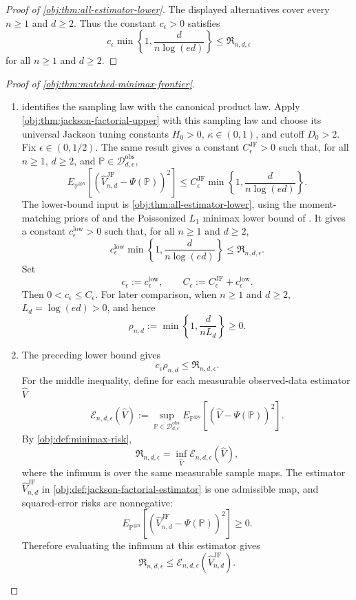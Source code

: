 \documentclass[11pt]{article}
\begin{document}
\begin{proof}[Proof of \cref{obj:thm:all-estimator-lower}]
The displayed alternatives cover every \(n\ge1\) and \(d\ge2\).  Thus the
constant \(c_\epsilon>0\) satisfies
\[
c_\epsilon\min\left\{1,\frac{d}{n\log(ed)}\right\}
\le
\mathfrak R_{n,d,\epsilon}
\]
for all \(n\ge1\) and \(d\ge2\).
\end{proof}

\begin{proof}[Proof of \cref{obj:thm:matched-minimax-frontier}]
\begin{enumerate}
\item {} identifies the sampling law with the canonical product law.  Apply \cref{obj:thm:jackson-factorial-upper} with this sampling law and choose its universal Jackson tuning constants \(H_0>0\), \(\kappa\in(0,1)\), and cutoff \(D_0>2\).  Fix \(\epsilon\in(0,1/2)\).  The same result gives a constant \(C_{\epsilon}^{\mathrm{JF}}>0\) such that, for all \(n\ge1\), \(d\ge2\), and \(\mathbb P\in\mathcal D_{d,\epsilon}^{\mathrm{obs}}\),
\[
E_{\mathbb P^{\otimes n}}
\left[
  \left(\widehat V_{n,d}^{\mathrm{JF}}-\Psi(\mathbb P)\right)^2
\right]
\le
C_{\epsilon}^{\mathrm{JF}}
\min\left\{1,\frac{d}{n\log(ed)}\right\}.
\]
The lower-bound input is \cref{obj:thm:all-estimator-lower}, using the moment-matching priors of \citep[Lemma 1 and Section 3.1]{CaiLow2011L1} and the Poissonized \(L_1\) minimax lower bound of \citep[Theorem 3 and equation (24)]{JiaoHanWeissman2018L1}.  It gives a constant \(c_{\epsilon}^{\mathrm{low}}>0\) such that, for all \(n\ge1\) and \(d\ge2\),
\[
c_{\epsilon}^{\mathrm{low}}
\min\left\{1,\frac{d}{n\log(ed)}\right\}
\le
\mathfrak R_{n,d,\epsilon}.
\]
Set
\[
c_\epsilon:=c_{\epsilon}^{\mathrm{low}},
\qquad
C_\epsilon:=C_{\epsilon}^{\mathrm{JF}}+c_{\epsilon}^{\mathrm{low}} .
\]
Then \(0<c_\epsilon\le C_\epsilon\).  For later comparison, when \(n\ge1\) and \(d\ge2\), \(L_d=\log(ed)>0\), and hence
\[
\rho_{n,d}:=
\min\left\{1,\frac{d}{nL_d}\right\}\ge0 .
\]

\item The preceding lower bound gives
\[
c_\epsilon\rho_{n,d}\le \mathfrak R_{n,d,\epsilon}.
\]
For the middle inequality, define for each measurable observed-data estimator \(\widehat V\)
\[
\mathcal E_{n,d,\epsilon}(\widehat V)
:=
\sup_{\mathbb P\in\mathcal D_{d,\epsilon}^{\mathrm{obs}}}
E_{\mathbb P^{\otimes n}}
\left[
  \left(\widehat V-\Psi(\mathbb P)\right)^2
\right].
\]
By \cref{obj:def:minimax-risk},
\[
\mathfrak R_{n,d,\epsilon}
=
\inf_{\widehat V}\mathcal E_{n,d,\epsilon}(\widehat V),
\]
where the infimum is over the same measurable sample maps.  The estimator \(\widehat V_{n,d}^{\mathrm{JF}}\) in \cref{obj:def:jackson-factorial-estimator} is one admissible map, and squared-error risks are nonnegative:
\[
E_{\mathbb P^{\otimes n}}
\left[
  \left(\widehat V_{n,d}^{\mathrm{JF}}-\Psi(\mathbb P)\right)^2
\right]\ge0 .
\]
Therefore evaluating the infimum at this estimator gives
\[
\mathfrak R_{n,d,\epsilon}
\le
\mathcal E_{n,d,\epsilon}(\widehat V_{n,d}^{\mathrm{JF}}).
\]


\end{enumerate}
\end{proof}
\end{document}
